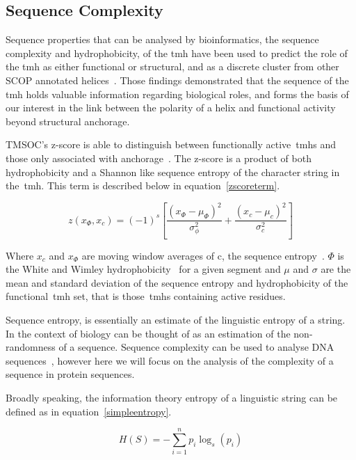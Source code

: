 \subsection{Sequence Complexity}

Sequence properties that can be analysed by bioinformatics, the sequence complexity and hydrophobicity, of the \gls{tmh} have been used to predict the role of the \gls{tmh} as either functional or structural, and as a discrete cluster from other SCOP annotated helices~\cite{Wong2012}.
Those findings demonstrated that the sequence of the \gls{tmh} holds valuable information regarding biological roles, and forms the basis of our interest in the link between the polarity of a helix and functional activity beyond structural anchorage.

TMSOC's z-score is able to distinguish between functionally active~\gls{tmh}s and those only associated with anchorage~\cite{Wong2012}.
The z-score is a product of both hydrophobicity and a Shannon like sequence entropy of the character string in the~\gls{tmh}. This term is described below in equation~\ref{zscoreterm}.

\begin{equation} \label{zscoreterm}
z({x}_{\Phi},{x}_{c})={(-1)}^{s}\left[\frac{{({x}_{\Phi}-{\mu}_{\Phi})}^{2}}{{\sigma}_{\phi}^{2}}+\frac{{({x}_{c}-{\mu}_{c})}^{2}}{{\sigma}_{c}^{2}}\right]
\end{equation}

Where $x_c$ and $x_\Phi$ are moving window averages of c, the sequence entropy~\cite{Wootton1996}. $\Phi$ is the White and Wimley hydrophobicity~\cite{White1999} for a given segment and $\mu$ and $\sigma$ are the mean and standard deviation of the sequence entropy and hydrophobicity of the functional~\gls{tmh} set, that is those~\gls{tmh}s containing active residues.

Sequence entropy, is essentially an estimate of the linguistic entropy of a string.
In the context of biology can be thought of as an estimation of the non-randomness of a sequence.
Sequence complexity can be used to analyse DNA sequences~\cite{Pinho2013, Oliver1993, Troyanskaya2002}, however here we will focus on the analysis of the complexity of a sequence in protein sequences.

Broadly speaking, the information theory entropy of a linguistic string can be defined as in equation~\ref{simpleentropy}.

\begin{equation} \label{simpleentropy}
	H(S)=-{\sum_{i=1}^n {p_i\log_s(p_i)}}
\end{equation}

